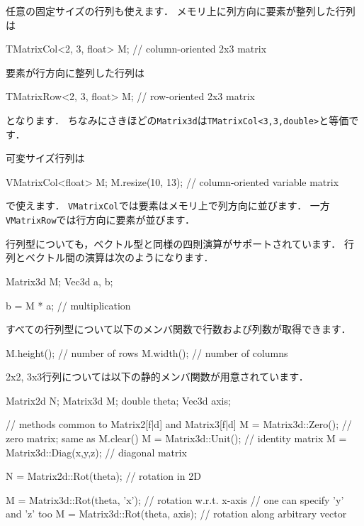 \KLUDGE 任意の固定サイズの行列も使えます．
\KLUDGE メモリ上に列方向に要素が整列した行列は
\begin{sourcecode}
TMatrixCol<2, 3, float> M;    // column-oriented 2x3 matrix
\end{sourcecode}
\KLUDGE 要素が行方向に整列した行列は
\begin{sourcecode}
TMatrixRow<2, 3, float> M;    // row-oriented 2x3 matrix
\end{sourcecode}
\KLUDGE となります．
\KLUDGE ちなみにさきほどの\texttt{Matrix3d}\KLUDGE は\texttt{TMatrixCol<3,3,double>}\KLUDGE と等価です．

\KLUDGE 可変サイズ行列は
\begin{sourcecode}
VMatrixCol<float> M;
M.resize(10, 13);             // column-oriented variable matrix
\end{sourcecode}
\KLUDGE で使えます．
\texttt{VMatrixCol}\KLUDGE では要素はメモリ上で列方向に並びます．
\KLUDGE 一方\texttt{VMatrixRow}\KLUDGE では行方向に要素が並びます．

\KLUDGE 行列型についても，ベクトル型と同様の四則演算がサポートされています．
\KLUDGE 行列とベクトル間の演算は次のようになります．
\begin{sourcecode}
Matrix3d M;
Vec3d a, b;

b = M * a;               // multiplication
\end{sourcecode}

\KLUDGE すべての行列型について以下のメンバ関数で行数および列数が取得できます．
\begin{sourcecode}
M.height();              // number of rows
M.width();               // number of columns
\end{sourcecode}

2x2, 3x3\KLUDGE 行列については以下の静的メンバ関数が用意されています．
\begin{sourcecode}
Matrix2d N;
Matrix3d M;
double theta;
Vec3d axis;

// methods common to Matrix2[f|d] and Matrix3[f|d]
M = Matrix3d::Zero();        // zero matrix; same as M.clear()
M = Matrix3d::Unit();        // identity matrix
M = Matrix3d::Diag(x,y,z);   // diagonal matrix

N = Matrix2d::Rot(theta);    // rotation in 2D

M = Matrix3d::Rot(theta, 'x');    // rotation w.r.t. x-axis
                                  // one can specify 'y' and 'z' too
M = Matrix3d::Rot(theta, axis);   // rotation along arbitrary vector
\end{sourcecode}


